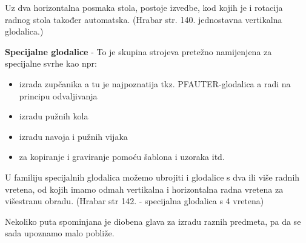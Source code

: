 \documentclass[a4paper,12pt]{article}
\numberwithin{figure}{section}
\begin{document}
Uz dva horizontalna posmaka stola, postoje izvedbe, kod kojih je i rotacija radnog stola također automatska. (Hrabar str. 140. jednostavna vertikalna glodalica.)\par
\textbf{Specijalne glodalice} - To je skupina strojeva pretežno namijenjena za specijalne svrhe kao npr:
\begin{itemize}
\item izrada zupčanika a tu je najpoznatija tkz. PFAUTER-glodalica a radi na principu odvaljivanja
\item izradu pužnih kola
\item izradu navoja i pužnih vijaka
\item za kopiranje i graviranje pomoću šablona i uzoraka itd.
\end{itemize}
U familiju specijalnih glodalica možemo ubrojiti i glodalice s dva ili više radnih vretena, od kojih imamo odmah vertikalna i horizontalna radna vretena za višestranu obradu. (Hrabar str 142. - specijalna glodalica s 4 vretena)\par
Nekoliko puta spominjana je diobena glava za izradu raznih predmeta, pa da se sada upoznamo malo pobliže.
\end{document}
